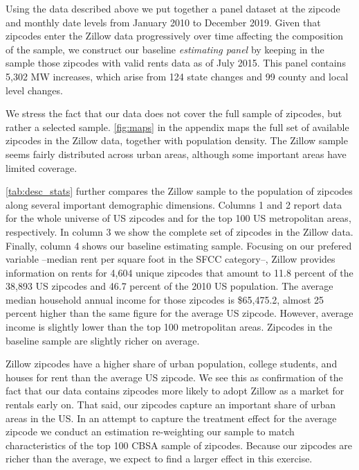 Using the data described above we put together a panel dataset at the zipcode and monthly 
date levels from January 2010 to December 2019. Given that zipcodes enter the Zillow data 
progressively over time affecting the composition of the sample, we construct our baseline 
\textit{estimating panel} by keeping in the sample those zipcodes with valid rents data as 
of July 2015. This panel contains 5,302 MW increases, which arise from 124 state changes 
and 99 county and local level changes.

We stress the fact that our data does not cover the full sample of zipcodes, but rather a
selected sample. \autoref{fig:maps} in the appendix maps the full set of available zipcodes
in the Zillow data, together with population density. The Zillow sample seems fairly 
distributed across urban areas, although some important areas have limited coverage. 

\autoref{tab:desc_stats} further compares the Zillow sample to the population of zipcodes
along several important demographic dimensions. Columns 1 and 2 report data for the whole 
universe of US zipcodes and for the top 100 US metropolitan areas, respectively. In column 
3 we show the complete set of zipcodes in the Zillow data. Finally, column 4 shows our 
baseline estimating sample. Focusing on our prefered variable --median rent per square
foot in the SFCC category--, Zillow provides information on rents for 4,604 unique zipcodes 
that amount to 11.8 percent of the 38,893 US zipcodes and 46.7 percent of the 2010 US 
population. The average median household annual income for those zipcodes is \$65,475.2, 
almost 25 percent higher than the same figure for the average US zipcode. However, average 
income is slightly lower than the top 100 metropolitan areas. Zipcodes in the baseline 
sample are slightly richer on average. 

Zillow zipcodes have a higher share of urban population, college students, and houses for 
rent than the average US zipcode. We see this as confirmation of the fact that our data 
contains zipcodes more likely to adopt Zillow as a market for rentals early on. That said, 
our zipcodes capture an important share of urban areas in the US. In an attempt to capture 
the treatment effect for the average zipcode we conduct an estimation re-weighting our 
sample to match characteristics of the top 100 CBSA sample of zipcodes. Because our 
zipcodes are richer than the average, we expect to find a larger effect in this exercise.

